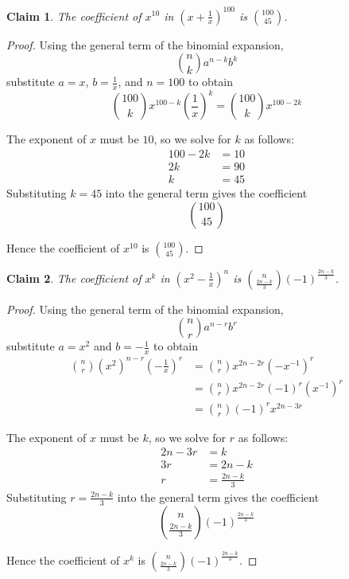 \documentclass{article}
\newtheorem{claim}{Claim}
\begin{document}
\begin{claim}
    The coefficient of $x^{10}$ in $\left(x + \frac{1}{x}\right)^{100}$ is $\binom{100}{45}$.
\end{claim}

\begin{proof}
    Using the general term of the binomial expansion,
    \[
    \binom{n}{k}a^{n-k}b^k
    \]
    substitute $a = x$, $b = \frac{1}{x}$, and $n = 100$ to obtain
    \[
    \binom{100}{k}x^{100-k}\left(\frac{1}{x}\right)^k = \binom{100}{k}x^{100-2k}
    \]

    \medskip

    The exponent of $x$ must be $10$, so we solve for $k$ as follows:
    \[
    \begin{aligned}
    100 - 2k &= 10 \\
    2k &= 90 \\
    k &= 45
    \end{aligned}
    \]
    Substituting $k = 45$ into the general term gives the coefficient
    \[
    \binom{100}{45}
    \]

    \medskip

    Hence the coefficient of $x^{10}$ is $\binom{100}{45}$.
\end{proof}

\begin{claim}
    The coefficient of $x^k$ in $\left(x^2 - \frac{1}{x}\right)^n$ is 
    $\binom{n}{\frac{2n-k}{3}}(-1)^{\frac{2n-k}{3}}$.
\end{claim}

\begin{proof}
    Using the general term of the binomial expansion,
    \[
    \binom{n}{r}a^{n-r}b^r
    \]
    substitute $a = x^2$ and $b = -\frac{1}{x}$ to obtain
    \[
    \begin{aligned}
    \binom{n}{r}(x^2)^{n-r}\left(-\frac{1}{x}\right)^r &= \binom{n}{r}x^{2n-2r}(-x^{-1})^r \\
    &= \binom{n}{r}x^{2n-2r}(-1)^{r}(x^{-1})^r \\
    &= \binom{n}{r}(-1)^{r}x^{2n-3r}
    \end{aligned}
    \]

    \medskip

    The exponent of $x$ must be $k$, so we solve for $r$ as follows:
    \[
    \begin{aligned}
    2n - 3r &= k \\
    3r &= 2n - k \\
    r &= \frac{2n - k}{3}
    \end{aligned}
    \]
    Substituting $r = \frac{2n - k}{3}$ into the general term gives the coefficient
    \[
    \binom{n}{\frac{2n-k}{3}}(-1)^{\frac{2n-k}{3}}
    \]

    \medskip

    Hence the coefficient of $x^k$ is $\binom{n}{\frac{2n-k}{3}}(-1)^{\frac{2n-k}{3}}$.
\end{proof}
\end{document}
